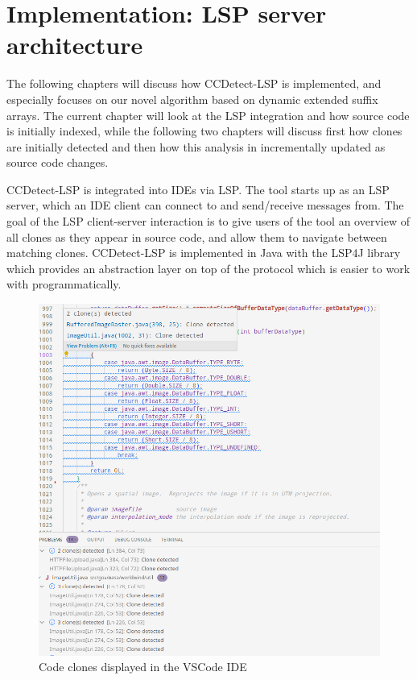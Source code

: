 \chapter{Implementation: LSP server architecture}
\label{lspimplementation}

The following chapters will discuss how CCDetect-LSP is implemented, and especially
focuses on our novel algorithm based on dynamic extended suffix arrays. The current
chapter will look at the LSP integration and how source code is initially indexed, while
the following two chapters will discuss first how clones are initially detected and then
how this analysis in incrementally updated as source code changes.

CCDetect-LSP is integrated into IDEs via LSP. The tool starts up as an LSP server, which
an IDE client can connect to and send/receive messages from. The goal of the LSP
client-server interaction is to give users of the tool an overview of all clones as they
appear in source code, and allow them to navigate between matching clones. CCDetect-LSP is
implemented in Java with the LSP4J library which provides an abstraction layer on top of
the protocol which is easier to work with programmatically.

\begin{figure}[t]
	\includegraphics[width=\textwidth]{figures/vscodecodeclone.png}
	\caption{Code clones displayed in the VSCode IDE}
	\label{fig:vscodeclones}
\end{figure}

